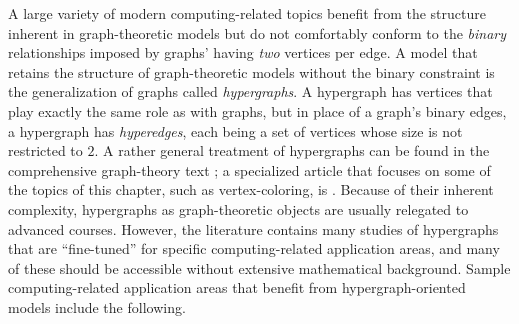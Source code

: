 A large variety of modern computing-related topics benefit from the
structure inherent in graph-theoretic models but do not comfortably
conform to the {\em binary} relationships imposed by graphs' having
{\em two} vertices per edge.  A model that retains the structure of
graph-theoretic models without the binary constraint is the
generalization of graphs called {\em hypergraphs}.  A hypergraph has
vertices that play exactly the same role as with graphs, but in place of
a graph's binary edges, a hypergraph has {\em hyperedges}, each being
a set of vertices whose size is not restricted to $2$.  A rather general
treatment of hypergraphs can be found in the comprehensive
graph-theory text \cite{Berge73}; a specialized article that focuses
on some of the topics of this chapter, such as vertex-coloring, is
\cite{Lovasz73}.  Because of their inherent complexity, hypergraphs as
graph-theoretic objects are usually relegated to advanced courses.
However, the literature contains many studies of hypergraphs that are
``fine-tuned'' for specific computing-related application areas, and
many of these should be accessible without extensive mathematical
background.  Sample  computing-related application areas that benefit
from hypergraph-oriented models include the following.
